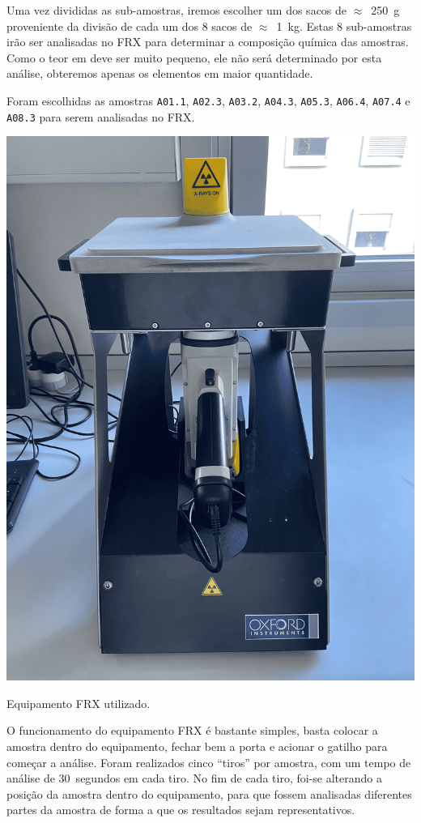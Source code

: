 \newpara

Uma vez divididas as sub-amostras, iremos escolher um dos sacos de $\approx$~250~g proveniente da divisão de cada um dos 8 sacos de $\approx$~1~kg.
Estas 8 sub-amostras irão ser analisadas no FRX para determinar a composição química das amostras.
Como o teor em  deve ser muito pequeno, ele não será determinado por esta análise, obteremos apenas os elementos em maior quantidade.

Foram escolhidas as amostras \texttt{A01.1}, \texttt{A02.3}, \texttt{A03.2}, \texttt{A04.3}, \texttt{A05.3}, \texttt{A06.4}, \texttt{A07.4} e \texttt{A08.3} para serem analisadas no FRX\@.

\begin{marginfigure}[1\baselineskip]
    \centering
    \includegraphics[width=0.7\linewidth]{figures/FRX}
    \caption{Equipamento FRX utilizado.}
    \label{fig:equipamento_frx}
\end{marginfigure}

O funcionamento do equipamento FRX é bastante simples, basta colocar a amostra dentro do equipamento, fechar bem a porta e acionar o gatilho para começar a análise.
Foram realizados cinco ``tiros'' por amostra, com um tempo de análise de 30~segundos em cada tiro.
No fim de cada tiro, foi-se alterando a posição da amostra dentro do equipamento, para que fossem analisadas diferentes partes da amostra de forma a que os resultados sejam representativos.

